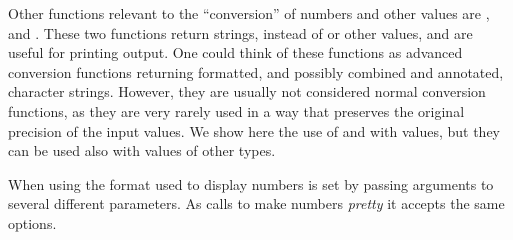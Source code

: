 \documentclass[krantz2]{krantz}\usepackage{knitr}%
\begin{document}
\sloppy
Other functions relevant to the ``conversion'' of numbers and other values are , and . These two functions return  strings, instead of  or other values, and are useful for printing output. One could think of these functions as advanced conversion functions returning formatted, and possibly combined and annotated, character strings. However, they are usually not considered normal conversion functions, as they are very rarely used in a way that preserves the original precision of the input values. We show here the use of  and  with  values, but they can be used also with values of other types.

When using  the format used to display numbers is set by passing arguments to several different parameters. As  calls  to make numbers \emph{pretty} it accepts the same options.
\end{document}
